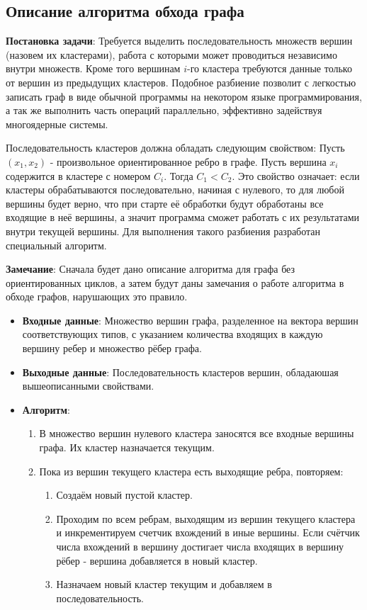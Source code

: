 \subsection{Описание алгоритма обхода графа}
\label{sec:algtraverse}
\textbf{Постановка задачи}: Требуется выделить последовательность множеств вершин (назовем их кластерами), работа с которыми может проводиться независимо внутри множеств. Кроме того вершинам $i$-го кластера требуются данные только от вершин из предыдущих кластеров. Подобное разбиение позволит с легкостью записать граф в виде обычной программы на некотором языке программирования, а так же выполнить часть операций параллельно, эффективно задействуя многоядерные системы.
\par
Последовательность кластеров должна обладать следующим свойством: Пусть $(x_1, x_2)$ - произвольное ориентированное ребро в графе. Пусть вершина $x_i$ содержится в кластере с номером $C_i$. Тогда $C_1 < C_2$. Это свойство означает: если кластеры обрабатываются последовательно, начиная с нулевого, то для любой вершины будет верно, что при старте её обработки будут обработаны все входящие в неё вершины, а значит программа сможет работать с их результатами внутри текущей вершины. Для выполнения такого разбиения разработан специальный алгоритм. 
\par
\textbf{Замечание}: Сначала будет дано описание алгоритма для графа без ориентированных циклов, а затем будут даны замечания о работе алгоритма в обходе графов, нарушающих это правило.
\begin{itemize}
	\item \textbf{Входные данные}: Множество вершин графа, разделенное на вектора вершин соответствующих типов, с указанием количества входящих в каждую вершину ребер и множество рёбер графа.
	\item \textbf{Выходные данные}: Последовательность кластеров вершин, обладаюшая вышеописанными свойствами. 
	\item \textbf{Алгоритм}: \begin{enumerate}
	    \item В множество вершин нулевого кластера заносятся все входные вершины графа. Их кластер назначается текущим.
	    \item Пока из вершин текущего кластера есть выходящие ребра, повторяем:
	    \begin{enumerate}
		\item Создаём новый пустой кластер.
	        \item Проходим по всем ребрам, выходящим из вершин текущего кластера и инкрементируем счетчик вхождений в иные вершины. Если счётчик числа вхождений в вершину достигает числа входящих в вершину рёбер - вершина добавляется в новый кластер.
		\item Назначаем новый кластер текущим и добавляем в последовательность. 
	    \end{enumerate}
	\end{enumerate}
\end{itemize}
